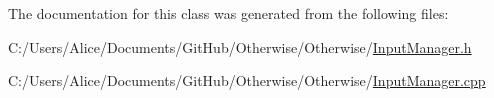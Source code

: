 The documentation for this class was generated from the following files\+:\begin{DoxyCompactItemize}
\item 
C\+:/\+Users/\+Alice/\+Documents/\+Git\+Hub/\+Otherwise/\+Otherwise/\hyperlink{_input_manager_8h}{Input\+Manager.\+h}\item 
C\+:/\+Users/\+Alice/\+Documents/\+Git\+Hub/\+Otherwise/\+Otherwise/\hyperlink{_input_manager_8cpp}{Input\+Manager.\+cpp}\end{DoxyCompactItemize}
